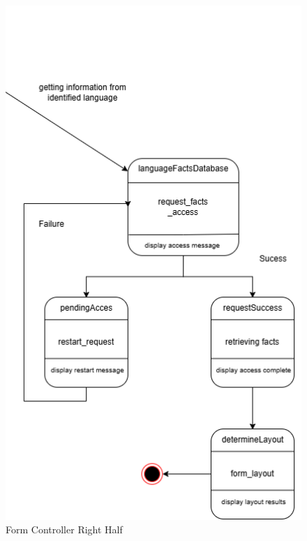 \begin{figure}[H]
	\centering
	\includegraphics[width=\textwidth, height=\textheight, keepaspectratio]{Section2/images/FormControllerRightHalf.png}
	\caption{Form Controller Right Half}
	\label{FormController}
\end{figure}